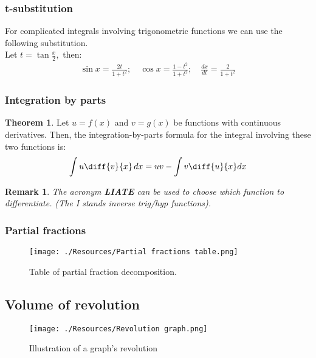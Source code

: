 \documentclass[12pt, a4paper]{article}
\newtheorem*{remark}{Remark}
\theoremstyle{definition}
\newtheorem{theorem}{Theorem}[section]
\theoremstyle{plain}
\begin{document}
\subsubsection{t-substitution}

For complicated integrals involving trigonometric functions we can use the following substitution. \\ 
Let $t=\tan{\frac{x}{2}},$ then:
$$\begin{aligned}
\sin{x} = \frac{2t}{1+t^2}; \quad \cos{x} = \frac{1-t^2}{1+t^2}; \quad \frac{dx}{dt} = \frac{2}{1+t^2}
\end{aligned}$$

\subsubsection{Integration by parts}

\begin{theorem}
Let $u = f (x)$ and $v = g(x)$ be functions with continuous derivatives. Then, the integration-by-parts formula for the integral involving these two functions is: $$\int u\diff{v}{x}\,dx = uv -\int v\diff{u}{x}dx$$
\end{theorem}

\begin{remark}
The acronym \textbf{LIATE} can be used to choose which function to differentiate. (The I stands inverse trig/hyp functions).
\end{remark}

\subsubsection{Partial fractions}

\begin{figure}[H]
\centering
\texttt{[image: ./Resources/Partial fractions table.png]}
\caption{Table of partial fraction decomposition.}
\label{fig:Partial fractions}
\end{figure}

\subsection{Volume of revolution}

\begin{figure}[H]
\centering
\texttt{[image: ./Resources/Revolution graph.png]}
\caption{Illustration of a graph's revolution}
\label{fig:revolution}
\end{figure}
\end{document}
